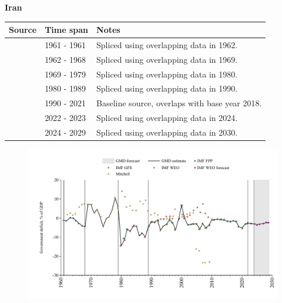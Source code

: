 \documentclass[12pt,a4paper,landscape]{article}
\begin{document}
\begin{adjustbox}{max totalsize={\paperwidth}{\paperheight},center}
\begin{minipage}[t][\textheight][t]{\textwidth}
\vspace*{0.5cm}
{}
\begin{center}
{\Large\bfseries Iran}
\end{center}
\vspace{0.5cm}
\begin{table}[H]
\centering
\small
\begin{tabular}{|l|l|l|}
\hline
\textbf{Source} & \textbf{Time span} & \textbf{Notes} \\
\hline
\rowcolor{white}\cite{Mitchell}& 1961 - 1961 &Spliced using overlapping data in 1962.\\
\rowcolor{lightgray}\cite{IMF_FPP}& 1962 - 1968 &Spliced using overlapping data in 1969.\\
\rowcolor{white}\cite{Mitchell}& 1969 - 1979 &Spliced using overlapping data in 1980.\\
\rowcolor{lightgray}\cite{IMF_GFS}& 1980 - 1989 &Spliced using overlapping data in 1990.\\
\rowcolor{white}\cite{IMF_WEO}& 1990 - 2021 &Baseline source, overlaps with base year 2018.\\
\rowcolor{lightgray}\cite{IMF_FPP}& 2022 - 2023 &Spliced using overlapping data in 2024.\\
\rowcolor{white}\cite{IMF_WEO_forecast}& 2024 - 2029 &Spliced using overlapping data in 2030.\\
\hline
\end{tabular}
\end{table}
\begin{figure}[H]
\centering
\includegraphics[width=\textwidth,height=0.6\textheight,keepaspectratio]{graphs/IRN_govdef_GDP.pdf}
\end{figure}
\end{minipage}
\end{adjustbox}
\end{document}
